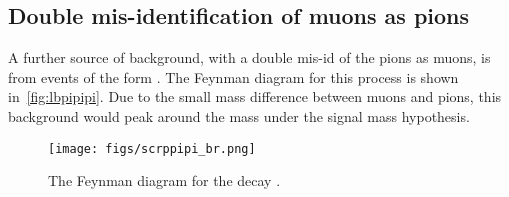 



\subsection{Double mis-identification of muons as pions}
\label{sec:double}
A further source of background, with a double mis-id of the pions as muons, is from events of the form \Lb\to\proton\pim\pip\pim. The Feynman diagram for this process is shown in~\autoref{fig:lbpipipi}. Due to the small mass difference between muons and pions, this background would peak around the \Lb mass under the signal mass hypothesis. 

\begin{figure}[!h]
  \centering
  \texttt{[image: figs/scrppipi\_br.png]}
  \caption{The Feynman diagram for the decay \Lb\to\proton\pim\pip\pim.}
  \label{fig:lbpipipi}
  \end{figure}


